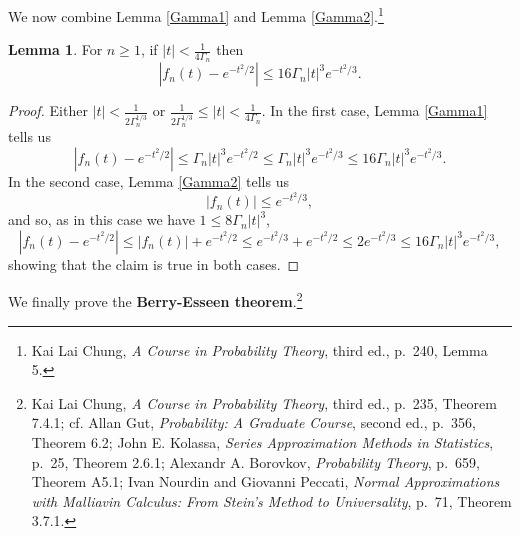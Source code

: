 \documentclass{article}
\theoremstyle{definition}
\newtheorem{lemma}[theorem]{Lemma}
\theoremstyle{definition}
\begin{document}
We now combine Lemma \ref{Gamma1} and Lemma \ref{Gamma2}.\footnote{Kai Lai Chung,
{\em A Course in Probability Theory}, third ed., p.~240, Lemma 5.}

\begin{lemma}
For $n \geq 1$, if $|t| < \frac{1}{4\Gamma_n}$ then
\[
|f_n(t) - e^{-t^2/2}| \leq 16 \Gamma_n |t|^3 e^{-t^2/3}.
\]
\label{Gamma3}
\end{lemma}
\begin{proof}
Either $|t|<\frac{1}{2\Gamma_n^{1/3}}$ or $\frac{1}{2\Gamma_n^{1/3}} \leq |t| < \frac{1}{4\Gamma_n}$. 
In the first case, Lemma \ref{Gamma1} tells us
\[
|f_n(t)-e^{-t^2/2}| \leq \Gamma_n |t|^3 e^{-t^2/2} \leq  \Gamma_n |t|^3 e^{-t^2/3}
\leq  16 \Gamma_n |t|^3 e^{-t^2/3}.
\]
In the second case, 
Lemma \ref{Gamma2} tells us
\[
|f_n(t)| \leq e^{-t^2/3},
\]
and so, as in this case we have $1 \leq 8\Gamma_n |t|^3$, 
\[
|f_n(t) - e^{-t^2/2}| \leq 
|f_n(t)| + e^{-t^2/2} \leq e^{-t^2/3} + e^{-t^2/2} \leq 2e^{-t^2/3}
\leq 16 \Gamma_n |t|^3 e^{-t^2/3},
\]
showing that the claim is true in both cases.
\end{proof}




We finally prove the \textbf{Berry-Esseen theorem}.\footnote{Kai Lai Chung,
{\em A Course in Probability Theory}, third ed., p.~235, Theorem 7.4.1; cf. Allan Gut, {\em Probability: A Graduate Course}, second ed., p.~356, Theorem 6.2;
John E. Kolassa, {\em Series Approximation Methods in Statistics}, p.~25, Theorem 2.6.1;
Alexandr A. Borovkov, {\em Probability Theory}, p.~659, Theorem A5.1;
Ivan Nourdin and Giovanni Peccati, {\em Normal Approximations with Malliavin Calculus: From Stein's Method to Universality}, p.~71, Theorem 3.7.1.}
\end{document}
